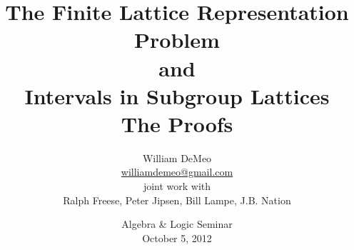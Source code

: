 
\newtheorem{prop}[theorem]{Proposition}
\newtheorem{assumption}[theorem]{Assumption}
\theoremstyle{definition}
\newtheorem{question}[theorem]{Question}
\newtheorem{claim}[claim]{Claim}
\newtheorem{conjecture}[conjecture]{Conjecture}
\newtheorem{case}{Case}
\theoremstyle{remark}
\newtheorem*{computations}{Computations}
\newtheorem*{remark}{Remark}
\newtheorem*{remarks}{Remarks}
\newtheorem*{notation}{Notation}

 \newcommand{\defn}[1]{\textcolor{darkred}{\textit{#1}}}
 \newcommand{\IE}{{\small IE}}
\title[FLRP]{The Finite Lattice Representation Problem\\
and\\
Intervals in Subgroup Lattices\\
The Proofs}

\author[William DeMeo]{William DeMeo\\
{\small \url{williamdemeo@gmail.com}}
 \\
   {\tiny joint work with}\\ 
   {\small Ralph Freese, Peter Jipsen, Bill Lampe, J.B. Nation}
 }

\date[Algebra \& Logic Seminar]{
Algebra \& Logic Seminar\\[6pt]
October 5, 2012
}

\subject{Universal Algebra; Lattice Theory.}%




\thicklines


